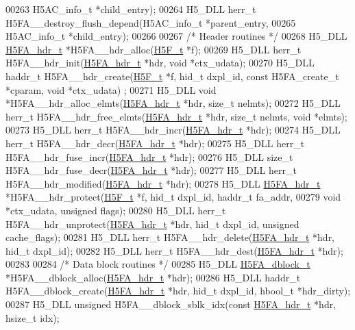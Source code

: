 \begin{DoxyCode}
00263     H5AC\_info\_t *child\_entry);
00264 H5\_DLL herr\_t H5FA\_\_destroy\_flush\_depend(H5AC\_info\_t *parent\_entry,
00265     H5AC\_info\_t *child\_entry);
00266 
00267 \textcolor{comment}{/* Header routines */}
00268 H5\_DLL \hyperlink{struct_h5_f_a__hdr__t}{H5FA\_hdr\_t} *H5FA\_\_hdr\_alloc(\hyperlink{struct_h5_f__t}{H5F\_t} *f);
00269 H5\_DLL herr\_t H5FA\_\_hdr\_init(\hyperlink{struct_h5_f_a__hdr__t}{H5FA\_hdr\_t} *hdr, \textcolor{keywordtype}{void} *ctx\_udata);
00270 H5\_DLL haddr\_t H5FA\_\_hdr\_create(\hyperlink{struct_h5_f__t}{H5F\_t} *f, hid\_t dxpl\_id, \textcolor{keyword}{const} H5FA\_create\_t *cparam, \textcolor{keywordtype}{void} *ctx\_udata)
      ;
00271 H5\_DLL \textcolor{keywordtype}{void} *H5FA\_\_hdr\_alloc\_elmts(\hyperlink{struct_h5_f_a__hdr__t}{H5FA\_hdr\_t} *hdr, \textcolor{keywordtype}{size\_t} nelmts);
00272 H5\_DLL herr\_t H5FA\_\_hdr\_free\_elmts(\hyperlink{struct_h5_f_a__hdr__t}{H5FA\_hdr\_t} *hdr, \textcolor{keywordtype}{size\_t} nelmts, \textcolor{keywordtype}{void} *elmts);
00273 H5\_DLL herr\_t H5FA\_\_hdr\_incr(\hyperlink{struct_h5_f_a__hdr__t}{H5FA\_hdr\_t} *hdr);
00274 H5\_DLL herr\_t H5FA\_\_hdr\_decr(\hyperlink{struct_h5_f_a__hdr__t}{H5FA\_hdr\_t} *hdr);
00275 H5\_DLL herr\_t H5FA\_\_hdr\_fuse\_incr(\hyperlink{struct_h5_f_a__hdr__t}{H5FA\_hdr\_t} *hdr);
00276 H5\_DLL \textcolor{keywordtype}{size\_t} H5FA\_\_hdr\_fuse\_decr(\hyperlink{struct_h5_f_a__hdr__t}{H5FA\_hdr\_t} *hdr);
00277 H5\_DLL herr\_t H5FA\_\_hdr\_modified(\hyperlink{struct_h5_f_a__hdr__t}{H5FA\_hdr\_t} *hdr);
00278 H5\_DLL \hyperlink{struct_h5_f_a__hdr__t}{H5FA\_hdr\_t} *H5FA\_\_hdr\_protect(\hyperlink{struct_h5_f__t}{H5F\_t} *f, hid\_t dxpl\_id, haddr\_t fa\_addr,
00279     \textcolor{keywordtype}{void} *ctx\_udata, \textcolor{keywordtype}{unsigned} flags);
00280 H5\_DLL herr\_t H5FA\_\_hdr\_unprotect(\hyperlink{struct_h5_f_a__hdr__t}{H5FA\_hdr\_t} *hdr, hid\_t dxpl\_id, \textcolor{keywordtype}{unsigned} cache\_flags);
00281 H5\_DLL herr\_t H5FA\_\_hdr\_delete(\hyperlink{struct_h5_f_a__hdr__t}{H5FA\_hdr\_t} *hdr, hid\_t dxpl\_id);
00282 H5\_DLL herr\_t H5FA\_\_hdr\_dest(\hyperlink{struct_h5_f_a__hdr__t}{H5FA\_hdr\_t} *hdr);
00283 
00284 \textcolor{comment}{/* Data block routines */}
00285 H5\_DLL \hyperlink{struct_h5_f_a__dblock__t}{H5FA\_dblock\_t} *H5FA\_\_dblock\_alloc(\hyperlink{struct_h5_f_a__hdr__t}{H5FA\_hdr\_t} *hdr);
00286 H5\_DLL haddr\_t H5FA\_\_dblock\_create(\hyperlink{struct_h5_f_a__hdr__t}{H5FA\_hdr\_t} *hdr, hid\_t dxpl\_id, hbool\_t *hdr\_dirty);
00287 H5\_DLL \textcolor{keywordtype}{unsigned} H5FA\_\_dblock\_sblk\_idx(\textcolor{keyword}{const} \hyperlink{struct_h5_f_a__hdr__t}{H5FA\_hdr\_t} *hdr, hsize\_t idx);

\end{DoxyCode}
